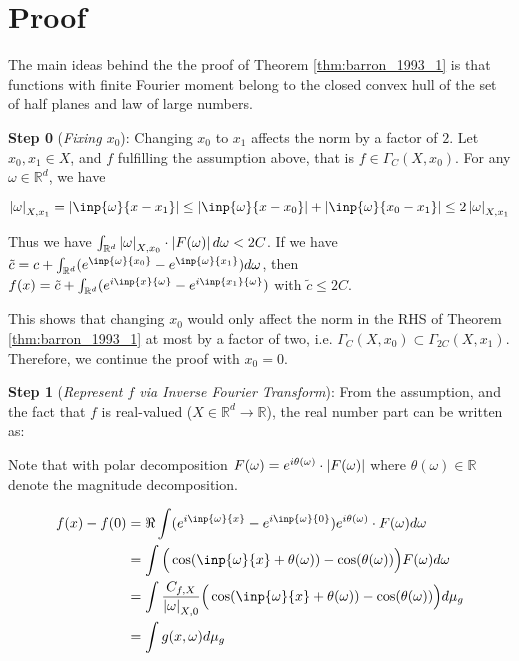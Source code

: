 \section{Proof}

The main ideas behind the the proof of Theorem \ref{thm:barron_1993_1} is that
functions with finite Fourier moment belong to the closed convex hull of the
set of half planes and law of large numbers.

\textbf{Step 0} (\textit{Fixing $x_0$}): Changing $x_0$ to $x_1$ 
affects the norm by a factor of $2$. Let $x_0, x_1 \in X$, and $f$ fulfilling
the assumption above, that is $f \in \Gamma_C(X, x_0)$. 
For any $\omega \in \mathbb{R}^d$, we have

\begin{equation}
    \abs{\omega}_{X, x_1} = \abs{\inp{\omega}{x-x_1}} \leq \abs{\inp{\omega}{x-x_0}} + \abs{\inp{\omega}{x_0-x_1}} \leq 2\abs{\omega}_{X, x_1}
\end{equation}

Thus we have $\int_{\mathbb{R}^d} \left| \omega \right|_{X, x_0} \cdot \left| F(\omega) \right| d\omega < 2C$.
If we have $\tilde{c} = c + \int_{\mathbb{R}^d} (e^{\inp{\omega}{x_0}} - e^{\inp{\omega}{x_1}}) d\omega$, 
then $f(x) = \tilde{c} + \int_{\mathbb{R}^d} (e^{i\inp{x}{\omega}} - e^{i\inp{x_1}{\omega}})$ with $\tilde{c} \leq 2C$.

This shows that changing $x_0$ would only affect the norm in the RHS of Theorem \ref{thm:barron_1993_1}
at most by a factor of two, i.e. $\Gamma_C(X, x_0) \subset \Gamma_{2C}(X, x_1)$.
Therefore, we continue the proof with $x_0 = 0$.

\textbf{Step 1} (\textit{Represent $f$ via Inverse Fourier Transform}): From the assumption,
and the fact that $f$ is real-valued ($X \in \mathbb{R}^d \to \mathbb{R}$),
the real number part can be written as:

Note that with polar decomposition $F(\omega) = e^{i\theta(\omega)} \cdot \left| F(\omega) \right|$ where $\theta(\omega) \in \mathbb{R}$ denote the magnitude decomposition.

\begin{align}
    f(x) - f(0) 
    &= \Re \int (e^{i\inp{\omega}{x}} - e^{i\inp{\omega}{0}}) e^{i\theta(\omega)} \cdot F(\omega) d\omega \\
    &= \int \Big(\cos(\inp{\omega}{x} + \theta(\omega)) - \cos(\theta(\omega))\Big)  
    F(\omega) d\omega \\
    &=  \int \frac{C_{f,X}}{\abs{\omega}_{X, 0}}\Big(\cos(\inp{\omega}{x} + \theta(\omega)) - \cos(\theta(\omega))\Big) d\mu_g \\
    &= \int g(x, \omega) d\mu_g \label{eq:barron_fouier_int}
\end{align}


